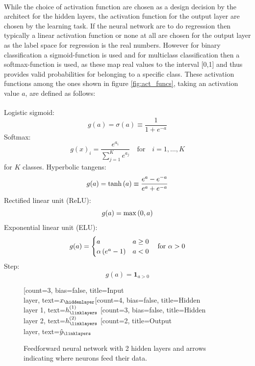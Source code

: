 \\
While the choice of activation function are chosen as a design decision by the architect for the hidden layers, the activation function for the output layer are chosen by the learning task. If the neural network are to do regression then typically a linear activation function or none at all are chosen for the output layer as the label space for regression is the real numbers. However for binary classification a sigmoid-function is used and for multiclass classification then a softmax-function is used, as these map real values to the interval [0,1] and thus provides valid probabilities for belonging to a specific class. These activation functions among the ones shown in figure \ref{fig:act_funcs}, taking an activation value $a$, are defined as follows:\\
\\
Logistic sigmoid:
\begin{equation*}
    g(a) = \sigma(a) \equiv \frac{1}{1 + e^{-a}}
\end{equation*}
Softmax:
\begin{equation*}
    g(x)_i = \frac{e^{a_i}}{\sum_{j=1}^K e^{a_j}} \quad \text{for} \quad i=1 ,\dots, K
\end{equation*}
for $K$ classes.
Hyperbolic tangens:
\begin{equation*}
    g(a) = \tanh \left (a\right) \equiv \frac{e^a - e^{-a}}{e^a + e^{-a}}
\end{equation*}
Rectified linear unit (ReLU):
\begin{equation} \label{eq:relu}
    g(a) = \max \left (0, a\right)
\end{equation}
Exponential linear unit (ELU):
\begin{equation*}
    g(a) = \begin{cases}
    a & a \geq 0 \\
    \alpha \left (e^a - 1\right) & a < 0
    \end{cases} \quad \text{for } \alpha > 0
\end{equation*}
Step:
\begin{equation*}
    g(a) = \mathbf{1}_{a > 0}
\end{equation*}


\begin{figure}
    \centering
    \begin{neuralnetwork}[height = 4]
        \newcommand{\x}[2]{$x_#2$}
        \newcommand{\y}[2]{$\hat{y}_#2$}
        \newcommand{\hfirst}[2]{\small $h^{(1)}_#2$}
        \newcommand{\hsecond}[2]{\small $h^{(2)}_#2$}
        [count=3, bias=false, title=Input\\layer, text=\x]
        \hiddenlayer[count=4, bias=false, title=Hidden\\layer 1, text=\hfirst] \linklayers
        \hiddenlayer[count=3, bias=false, title=Hidden\\layer 2, text=\hsecond] \linklayers
        \outputlayer[count=2, title=Output\\layer, text=\y] \linklayers
    \end{neuralnetwork}
    \caption{Feedforward neural network with 2 hidden layers and arrows indicating where neurons feed their data.}
    \label{fig:mlp}
\end{figure}

